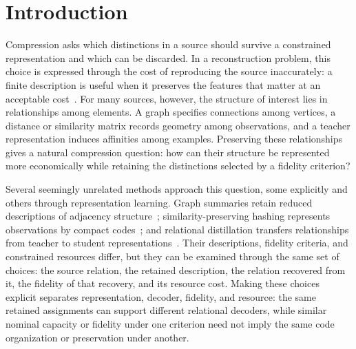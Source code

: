 \section{Introduction}
\label{sec:introduction}

Compression asks which distinctions in a source should survive a constrained representation and which can be discarded.
In a reconstruction problem, this choice is expressed through the cost of reproducing the source inaccurately: a finite description is useful when it preserves the features that matter at an acceptable cost~\citep{gray1998quantization,cover2006elements}.
For many sources, however, the structure of interest lies in relationships among elements.
A graph specifies connections among vertices, a distance or similarity matrix records geometry among observations, and a teacher representation induces affinities among examples.
Preserving these relationships gives a natural compression question: how can their structure be represented more economically while retaining the distinctions selected by a fidelity criterion?

Several seemingly unrelated methods approach this question, some explicitly and others through representation learning.
Graph summaries retain reduced descriptions of adjacency structure~\citep{riondato2017graph}; similarity-preserving hashing represents observations by compact codes~\citep{weiss2008spectral}; and relational distillation transfers relationships from teacher to student representations~\citep{park2019relational,tung2019similarity}.
Their descriptions, fidelity criteria, and constrained resources differ, but they can be examined through the same set of choices: the source relation, the retained description, the relation recovered from it, the fidelity of that recovery, and its resource cost.
Making these choices explicit separates representation, decoder, fidelity, and resource: the same retained assignments can support different relational decoders, while similar nominal capacity or fidelity under one criterion need not imply the same code organization or preservation under another.


